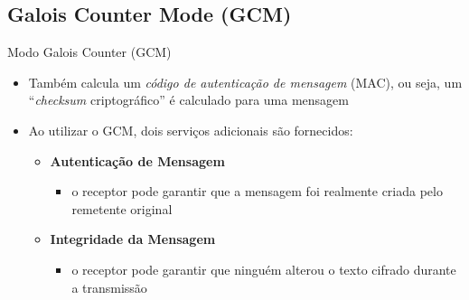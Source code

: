 \documentclass{beamer}
\begin{document}
\subsection{Galois Counter Mode (GCM)}
\begin{frame}{Modo Galois Counter (GCM)}

\begin{itemize}
    \item Também calcula um \textit{código de autenticação de mensagem} (MAC), ou seja, um ``\textit{checksum} criptográfico'' é calculado para uma mensagem
    
    \item Ao utilizar o GCM, dois serviços adicionais são fornecidos:
    \begin{itemize}
        \item \textbf{Autenticação de Mensagem}
        \begin{itemize}
            \item o receptor pode garantir que a mensagem foi realmente criada pelo remetente original
        \end{itemize}
        
        \item \textbf{Integridade da Mensagem}
        \begin{itemize}
            \item o receptor pode garantir que ninguém alterou o texto cifrado durante a transmissão
        \end{itemize}
    \end{itemize}
\end{itemize}

\end{frame}

\end{document}
